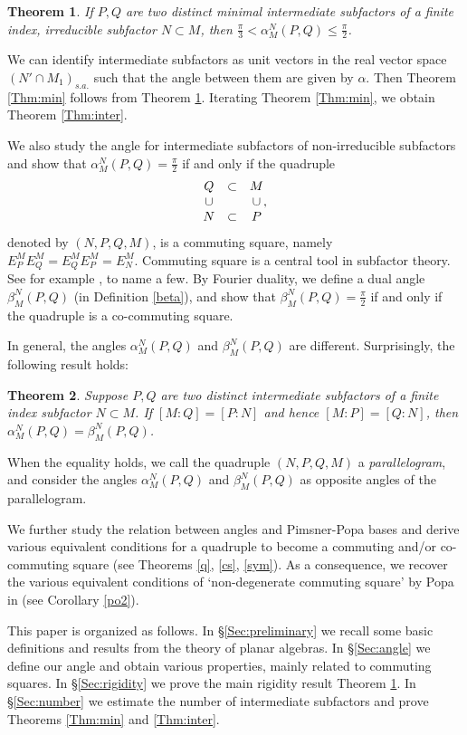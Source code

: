 \documentclass[11pt,letterpaper]{amsart}
\newtheorem{theorem}{Theorem}[section]
\theoremstyle{definition}
\theoremstyle{remark}
\begin{document}
\begin{theorem}\label{Thm:angle}
If  $P,Q$ are two distinct minimal intermediate subfactors of a finite index, irreducible subfactor $N\subset M$, then $ \frac{\pi}{3}< \alpha^N_M(P,Q) \leq  \frac{\pi}{2}$. 
\end{theorem}

We can identify intermediate subfactors as unit vectors in the real vector space $(N' \cap M_1)_{s.a.}$ such that the angle between them are given by $\alpha$. Then Theorem \ref{Thm:min} follows from Theorem \ref{Thm:angle}. Iterating Theorem \ref{Thm:min}, we obtain Theorem \ref{Thm:inter}.


We also study the angle for intermediate subfactors of non-irreducible subfactors and show that $\alpha^N_M(P,Q) = \frac{\pi}{2}$ if and only if the quadruple
$$\begin{matrix}
Q &\subset & M \cr
\cup &\ &\cup\cr
N  &\subset & P
\end{matrix},$$
denoted by $(N,P,Q,M)$, is a commuting square, namely $E^M_P E^M_Q= E^M_Q E^M_P = E^M_N$. Commuting square is a central tool in subfactor theory. See for example \cite{JS,GHJ,Po2,Po3,Po4,Po5}, to name a few.
By Fourier duality, we define a dual angle $\beta^N_M(P,Q)$ (in Definition \ref{beta}), and show that $\beta^N_M(P,Q) = \frac{\pi}{2}$ if and only if the quadruple is a co-commuting square.

 
In general, the angles $\alpha^N_M(P,Q)$ and $\beta^N_M(P,Q)$ are different. 
Surprisingly, the following result holds:
\begin{theorem}
Suppose $P,Q$ are two distinct intermediate subfactors of a finite index subfactor $N\subset M$. If $[M:Q]= [P:N]$ and hence $[M:P] = [Q:N]$, then $\alpha^N_M(P,Q)=\beta^N_M(P,Q)$.
\end{theorem} 
When the equality holds, we call the quadruple $(N,P,Q,M)$ a {\it parallelogram}, and consider the angles $\alpha^N_M (P, Q)$ and $\beta^N_M(P, Q)$ as opposite angles of the parallelogram.
 
We further study the relation between angles and Pimsner-Popa bases and derive various equivalent conditions for a quadruple to become a commuting and/or co-commuting square (see Theorems \ref{q}, \ref{cs}, \ref{sym}). As a consequence, we recover the various equivalent 
conditions of `non-degenerate commuting square' by Popa in \cite{Po2}  (see Corollary \ref{po2}).




This paper is organized as follows. In \S \ref{Sec:preliminary} we recall some basic definitions and results from the theory of planar algebras. 
In \S \ref{Sec:angle} we define our angle and obtain various properties, mainly related to commuting squares. 
In \S \ref{Sec:rigidity} we prove the main rigidity result Theorem \ref{Thm:angle}.
In \S \ref{Sec:number} we estimate the number of intermediate subfactors and prove Theorems \ref{Thm:min} and \ref{Thm:inter}.
\end{document}
